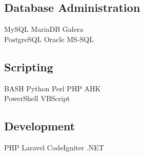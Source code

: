 \documentclass[letterpaper]{deedy-resume} %
\begin{document}
\begin{minipage}[t]{0.33\textwidth}
\subsection{Database Administration}
MySQL \textbullet{} MariaDB \textbullet{} Galera \\
PostgreSQL \textbullet{} Oracle \textbullet{} MS-SQL \\

\sectionspace %
\sectionspace %

\subsection{Scripting}
BASH \textbullet{} Python \textbullet{} Perl \textbullet{} PHP \textbullet{} AHK \\
PowerShell \textbullet{} VBScript \\

\sectionspace %
\sectionspace %

\subsection{Development}
PHP \textbullet{} Laravel \textbullet{} CodeIgniter \textbullet{} .NET \\

\sectionspace %



\end{minipage} %
\hfill
%
%
\end{document}
